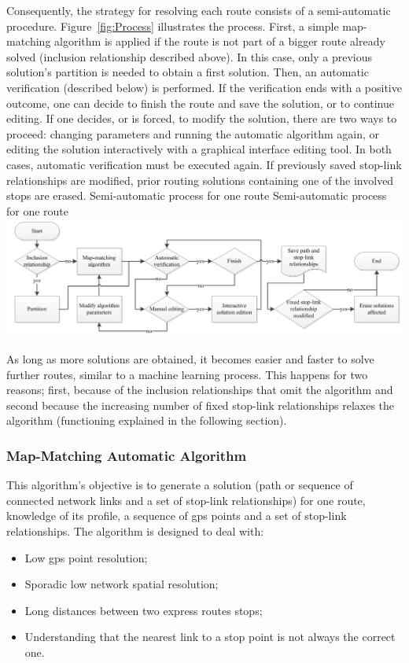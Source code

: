 Consequently, the strategy for resolving each route consists of a semi-automatic procedure. Figure~\ref{fig:Process} illustrates the process. First, a simple map-matching algorithm is applied if the route is not part of a bigger route already solved (inclusion relationship described above). In this case, only a previous solution's partition is needed to obtain a first solution. Then, an automatic verification (described below) is performed. If the verification ends with a positive outcome, one can decide to finish the route and save the solution, or to continue editing. If one decides, or is forced, to modify the solution, there are two ways to proceed: changing parameters and running the automatic algorithm again, or editing the solution interactively with a graphical interface editing tool. In both cases, automatic verification must be executed again. If previously saved stop-link relationships are modified, prior routing solutions containing one of the involved stops are erased.
%
\createfigure
{Semi-automatic process for one route}
{Semi-automatic process for one route}
{\label{fig:Process}}
{\includegraphics[width=1.0\textwidth]{extending/figures/semiAuto/Process.png}}
{}

As long as more solutions are obtained, it becomes easier and faster to solve further routes, similar to a  machine learning process. This happens for two reasons; first, because of the inclusion relationships that omit the algorithm and second because the increasing number of fixed stop-link relationships relaxes the algorithm  (functioning explained in the following section).

\subsubsection{Map-Matching Automatic Algorithm}
This algorithm's objective is to generate a solution (path or sequence of connected network links and a set of stop-link relationships) for one route, knowledge of its profile, a sequence of \gls{gps} points and a set of stop-link relationships. The algorithm is designed to deal with:
%
\begin{itemize}\styleItemize
\item	Low \gls{gps} point resolution;
\item	Sporadic low network spatial resolution;
\item	Long distances between two express routes stops;
\item	Understanding that the nearest link to a stop point is not always the correct one.
\end{itemize}

